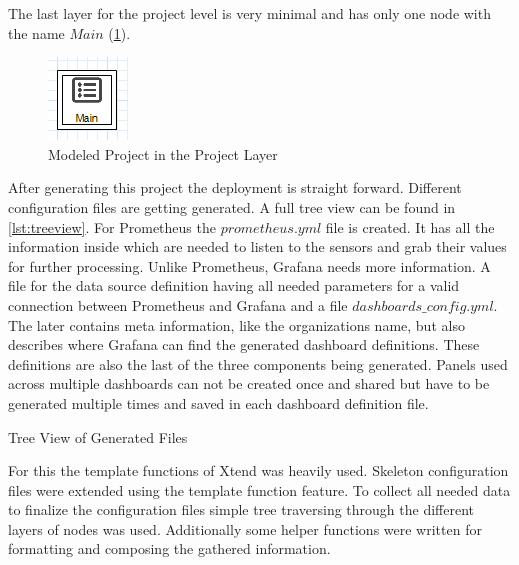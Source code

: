 The last layer for the project level is very minimal and has only one node with the name $Main$ (\cref{fig:modeled_project_layer}).

\begin{figure}[!ht]
	\centering
	\includegraphics{assets/images/projectLayer}
	\caption{Modeled Project in the Project Layer}
	\label{fig:modeled_project_layer}
\end{figure}

After generating this project the  deployment is straight forward. Different configuration files are getting generated. A full tree view can be found in \cref{lst:treeview}. For Prometheus the $prometheus.yml$ file is created. It has all the information inside which are needed to listen to the sensors and grab their values for further processing. Unlike Prometheus, Grafana needs more information. A file for the data source definition having all needed parameters for a valid connection between Prometheus and Grafana and a file $dashboards\_config.yml$. The later contains meta information, like the organizations name, but also describes where Grafana can find the generated dashboard definitions. These definitions are also the last of the three components being generated. Panels used across multiple dashboards can not be created once and shared but have to be generated multiple times and saved in each dashboard definition file.

\begin{listing}[!ht]
	\setlength{\DTbaselineskip}{20pt}
	\caption{Tree View of Generated Files}
	\label{lst:treeview}
\end{listing}

For this the template functions of Xtend was heavily used. Skeleton configuration files were extended using the template function feature. To collect all needed data to finalize the configuration files simple tree traversing through the different layers of nodes was used. Additionally some helper functions were written for formatting and composing the gathered information. 

